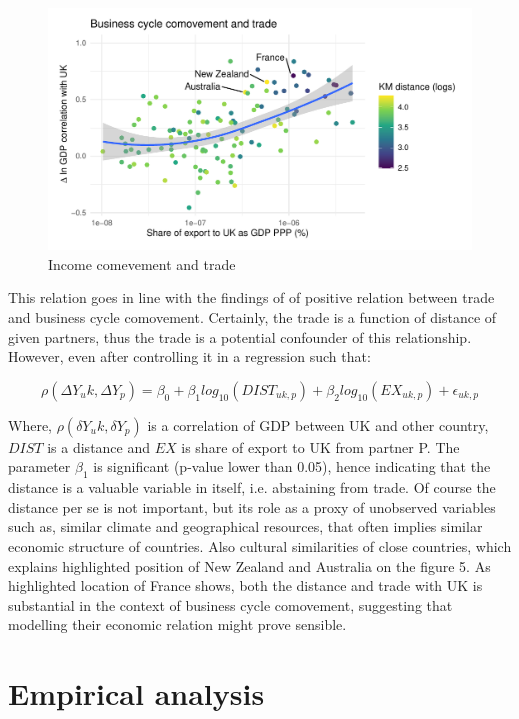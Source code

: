\documentclass{article}
\begin{document}
\begin{figure}[!ht]
\centering
\includegraphics[scale=0.8]{graphs/cross_section_corr2.pdf}
\caption{Income comevement and trade}
\end{figure}

This relation goes in line with the findings of \cite{frankel_rose} of positive relation between trade and business cycle comovement. Certainly, the trade is a function of distance of given partners, thus the trade is a potential confounder of this relationship. However, even after controlling it in a regression such that:

$$ \rho (\Delta Y_uk, \Delta Y_p) = \beta_0 + \beta_1 log_{10}(DIST_{ uk, p}) + \beta_2 log_{10}( EX_{uk, p}) + \epsilon_{uk, p} $$

Where, $\rho (\delta Y_uk, \delta Y_p)$ is a correlation of GDP between UK and other country, $DIST$ is a distance and $EX$ is share of export to UK from partner P. The parameter $\beta_1$ is significant (p-value lower than 0.05), hence indicating that the distance is a valuable variable in itself, i.e. abstaining from trade. Of course the distance per se is not important, but its role as a proxy of unobserved variables such as, similar climate and geographical resources, that often implies similar economic structure of countries. Also cultural similarities of close countries, which explains highlighted position of New Zealand and Australia on the figure 5. As highlighted location of France shows, both the distance and trade with UK is substantial in the context of business cycle comovement, suggesting that modelling their economic relation might prove sensible. 

\section*{Empirical analysis}
\end{document}
